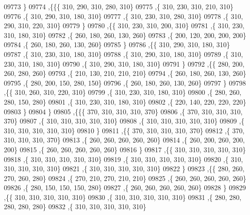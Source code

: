 \begin{DoxyCode}
09773    \}
09774   ,\{\{\{   310,   290,   310,   280,   310\}
09775     ,\{   310,   230,   310,   210,   310\}
09776     ,\{   310,   290,   310,   180,   310\}
09777     ,\{   310,   230,   310,   280,   310\}
09778     ,\{   310,   290,   310,   220,   310\}
09779     \}
09780    ,\{\{   310,   230,   310,   200,   310\}
09781     ,\{   310,   230,   310,   180,   310\}
09782     ,\{   260,   180,   260,   130,   260\}
09783     ,\{   200,   120,   200,   200,   200\}
09784     ,\{   260,   180,   260,   130,   260\}
09785     \}
09786    ,\{\{   310,   290,   310,   180,   310\}
09787     ,\{   310,   230,   310,   180,   310\}
09788     ,\{   310,   290,   310,   180,   310\}
09789     ,\{   310,   230,   310,   180,   310\}
09790     ,\{   310,   290,   310,   180,   310\}
09791     \}
09792    ,\{\{   280,   200,   260,   280,   260\}
09793     ,\{   210,   130,   210,   210,   210\}
09794     ,\{   260,   180,   260,   130,   260\}
09795     ,\{   280,   200,   150,   280,   150\}
09796     ,\{   260,   180,   260,   130,   260\}
09797     \}
09798    ,\{\{   310,   260,   310,   220,   310\}
09799     ,\{   310,   230,   310,   180,   310\}
09800     ,\{   280,   260,   280,   150,   280\}
09801     ,\{   310,   230,   310,   180,   310\}
09802     ,\{   220,   140,   220,   220,   220\}
09803     \}
09804    \}
09805   ,\{\{\{   370,   310,   310,   310,   370\}
09806     ,\{   370,   310,   310,   310,   370\}
09807     ,\{   310,   310,   310,   310,   310\}
09808     ,\{   310,   310,   310,   310,   310\}
09809     ,\{   310,   310,   310,   310,   310\}
09810     \}
09811    ,\{\{   370,   310,   310,   310,   370\}
09812     ,\{   370,   310,   310,   310,   370\}
09813     ,\{   260,   260,   260,   260,   260\}
09814     ,\{   260,   200,   260,   200,   200\}
09815     ,\{   260,   260,   260,   260,   260\}
09816     \}
09817    ,\{\{   310,   310,   310,   310,   310\}
09818     ,\{   310,   310,   310,   310,   310\}
09819     ,\{   310,   310,   310,   310,   310\}
09820     ,\{   310,   310,   310,   310,   310\}
09821     ,\{   310,   310,   310,   310,   310\}
09822     \}
09823    ,\{\{   280,   260,   270,   260,   280\}
09824     ,\{   270,   210,   270,   210,   210\}
09825     ,\{   260,   260,   260,   260,   260\}
09826     ,\{   280,   150,   150,   150,   280\}
09827     ,\{   260,   260,   260,   260,   260\}
09828     \}
09829    ,\{\{   310,   310,   310,   310,   310\}
09830     ,\{   310,   310,   310,   310,   310\}
09831     ,\{   280,   280,   280,   280,   280\}
09832     ,\{   310,   310,   310,   310,   310\}

\end{DoxyCode}
